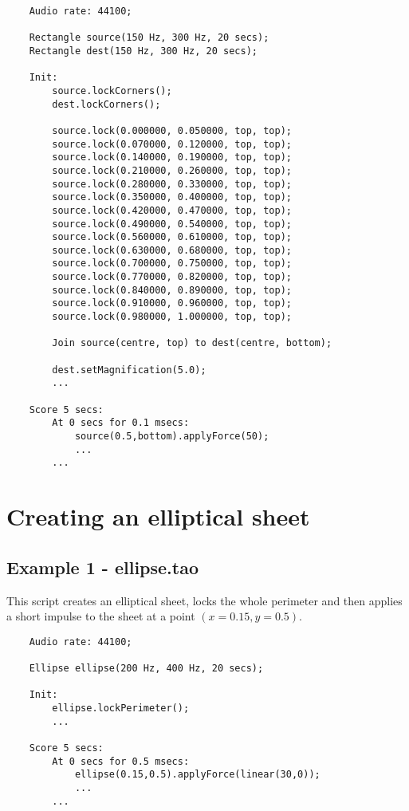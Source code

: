 \begin{verbatim}
    Audio rate: 44100;
        
    Rectangle source(150 Hz, 300 Hz, 20 secs);
    Rectangle dest(150 Hz, 300 Hz, 20 secs);
        
    Init:
        source.lockCorners();
        dest.lockCorners();
        
        source.lock(0.000000, 0.050000, top, top);
        source.lock(0.070000, 0.120000, top, top);
        source.lock(0.140000, 0.190000, top, top);
        source.lock(0.210000, 0.260000, top, top);
        source.lock(0.280000, 0.330000, top, top);
        source.lock(0.350000, 0.400000, top, top);
        source.lock(0.420000, 0.470000, top, top);
        source.lock(0.490000, 0.540000, top, top);
        source.lock(0.560000, 0.610000, top, top);
        source.lock(0.630000, 0.680000, top, top);
        source.lock(0.700000, 0.750000, top, top);
        source.lock(0.770000, 0.820000, top, top);
        source.lock(0.840000, 0.890000, top, top);
        source.lock(0.910000, 0.960000, top, top);
        source.lock(0.980000, 1.000000, top, top);
        
        Join source(centre, top) to dest(centre, bottom);
        
        dest.setMagnification(5.0);
        ...
        
    Score 5 secs:
        At 0 secs for 0.1 msecs:
            source(0.5,bottom).applyForce(50);
            ...
        ...    
\end{verbatim}

\section{Creating an elliptical sheet}
\subsection{Example 1 - ellipse.tao}
This script creates an elliptical sheet, locks the whole perimeter
and then applies a short impulse to the sheet at a point $(x=0.15,y=0.5)$.

\begin{verbatim}
    Audio rate: 44100;
        
    Ellipse ellipse(200 Hz, 400 Hz, 20 secs);
        
    Init:
        ellipse.lockPerimeter();
        ...
        
    Score 5 secs:
        At 0 secs for 0.5 msecs:
            ellipse(0.15,0.5).applyForce(linear(30,0));
            ...
        ...
\end{verbatim}
 
